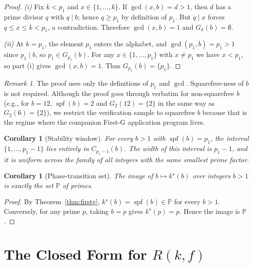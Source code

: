 \documentclass[11pt,reqno]{amsart}
\theoremstyle{plain}
\newtheorem{corollary}[theorem]{Corollary}
\theoremstyle{definition}
\theoremstyle{remark}
\newtheorem*{remark}{Remark}
\DeclareMathOperator{\spf}{spf}
\newcommand{\Prm}{\mathbb{P}}
\begin{document}
\begin{proof}
\textit{(i)} Fix $k < p_{1}$ and $x \in \{1,\dots,k\}$. If
$\gcd(x,b) = d > 1$, then $d$ has a prime divisor $q$ with $q\mid b$;
hence $q \ge p_{1}$ by definition of $p_{1}$. But $q \mid x$ forces
$q \le x \le k < p_{1}$, a contradiction. Therefore $\gcd(x,b) = 1$
and $G_{k}(b) = \emptyset$.

\textit{(ii)} At $k = p_{1}$, the element $p_{1}$ enters the alphabet,
and $\gcd(p_{1},b) = p_{1} > 1$ since $p_{1}\mid b$, so
$p_{1}\in G_{p_{1}}(b)$. For any $x \in \{1,\dots,p_{1}\}$ with
$x \ne p_{1}$ we have $x < p_{1}$, so part (i) gives $\gcd(x,b)=1$.
Thus $G_{p_{1}}(b) = \{p_{1}\}$.
\end{proof}

\begin{remark}
The proof uses only the definitions of $p_{1}$ and $\gcd$.
Squarefree-ness of $b$ is not required. Although the proof goes
through verbatim for non-squarefree $b$ (e.g., for $b = 12$,
$\spf(b) = 2$ and $G_{2}(12) = \{2\}$ in the same way as
$G_{2}(6) = \{2\}$), we restrict the verification sample to squarefree
$b$ because that is the regime where the companion First-G application
program lives.
\end{remark}

\begin{corollary}[Stability window]\label{cor:stability}
For every $b > 1$ with $\spf(b) = p_{1}$, the interval
$\{1,\dots,p_{1}-1\}$ lies entirely in $C_{p_{1}-1}(b)$. The width of
this interval is $p_{1}-1$, and it is uniform across the family of
all integers with the same smallest prime factor.
\end{corollary}

\begin{corollary}[Phase-transition set]\label{cor:phase}
The image of $b\mapsto k^{\star}(b)$ over integers $b > 1$ is exactly
the set $\Prm$ of primes.
\end{corollary}

\begin{proof}
By Theorem~\ref{thm:firstg}, $k^{\star}(b) = \spf(b) \in \Prm$ for
every $b > 1$. Conversely, for any prime $p$, taking $b = p$ gives
$k^{\star}(p) = p$. Hence the image is $\Prm$.
\end{proof}

\section{The Closed Form for $R(k,f)$}\label{sec:harmonic}
\end{document}
